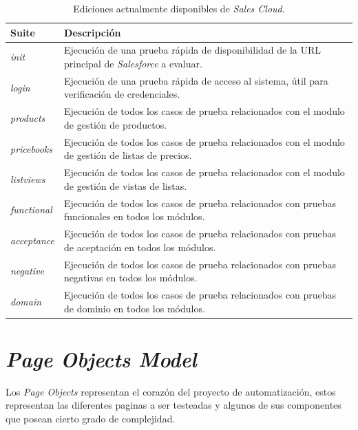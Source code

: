 \begin{table}
\centering
\begin{tabular}{|l|p{12.0cm}|}
\hline
\footnotesize{\textbf{Suite}} & \footnotesize{\textbf{Descripción}} \\
\hline
\footnotesize{\emph{init}} & \footnotesize{Ejecución de una prueba rápida de
disponibilidad de la URL principal de \emph{Salesforce} a evaluar.} \\
\footnotesize{\emph{login}} & \footnotesize{Ejecución de una prueba rápida de
acceso al sistema, útil para verificación de credenciales.} \\
\footnotesize{\emph{products}} & \footnotesize{Ejecución de todos los casos de
prueba relacionados con el modulo de gestión  de productos.} \\
\footnotesize{\emph{pricebooks}} & \footnotesize{Ejecución de todos los casos de
prueba relacionados con el modulo de gestión de listas de precios.} \\
\footnotesize{\emph{listviews}} & \footnotesize{Ejecución de todos los casos de
prueba relacionados con el modulo de gestión de vistas de listas.} \\
\footnotesize{\emph{functional}} & \footnotesize{Ejecución de todos los casos de
prueba relacionados con pruebas funcionales en todos los módulos.} \\
\footnotesize{\emph{acceptance}} & \footnotesize{Ejecución de todos los casos de
prueba relacionados con pruebas de aceptación en todos los módulos.} \\
\footnotesize{\emph{negative}} & \footnotesize{Ejecución de todos los casos de
prueba relacionados con pruebas negativas en todos los módulos.} \\
\footnotesize{\emph{domain}} & \footnotesize{Ejecución de todos los casos de
prueba relacionados con pruebas de dominio en todos los módulos.} \\
\hline
\end{tabular}
\caption{Ediciones actualmente disponibles de \emph{Sales Cloud}.}
\label{suites}
\end{table}

\section{\emph{Page Objects Model}}
Los \emph{Page Objects} representan el corazón del proyecto de automatización,
estos representan las diferentes paginas a ser testeadas y algunos de sus
componentes que posean cierto grado de complejidad.

